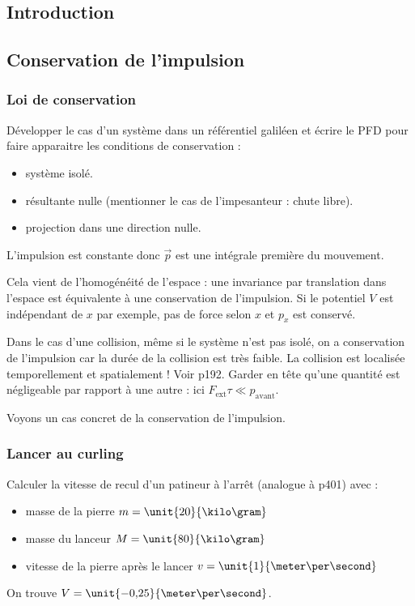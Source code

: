 \subsection*{Introduction}

\subsection{Conservation de l'impulsion}

\subsubsection{Loi de conservation}

Développer le cas d'un système dans un référentiel galiléen et écrire le PFD pour faire apparaitre les conditions de conservation :
\begin{itemize}
\item système isolé.
\item résultante nulle (mentionner le cas de l'impesanteur : chute libre).
\item projection dans une direction nulle.
\end{itemize}
L'impulsion est constante donc $\overrightarrow{p}$ est une intégrale première du mouvement.

Cela vient de l'homogénéité de l'espace : une invariance par translation dans l'espace est équivalente à une conservation de l'impulsion.
Si le potentiel $V$ est indépendant de $x$ par exemple, pas de force selon $x$ et $p_x$ est conservé.

\begin{remarque}
Dans le cas d'une collision, même si le système n'est pas isolé, on a conservation de l'impulsion car la durée de la collision est très faible.
La collision est localisée temporellement et spatialement !
Voir \cite{Seigne2014} p192.
Garder en tête qu'une quantité est négligeable par rapport à une autre : ici $F_\mathrm{ext}\tau \ll p_\mathrm{avant}$.
\end{remarque}

\begin{transition}
Voyons un cas concret de la conservation de l'impulsion.
\end{transition}

\subsubsection{Lancer au curling}

Calculer la vitesse de recul d'un patineur à l'arrêt (analogue à \cite{Bocquet2002} p401) avec :
\begin{itemize}
\item masse de la pierre $m=\unit{20}{\kilo\gram}$
\item masse du lanceur $M=\unit{80}{\kilo\gram}$
\item vitesse de la pierre après le lancer $v=\unit{1}{\meter\per\second}$
\end{itemize}
On trouve $V=\unit{-0{,}25}{\meter\per\second}$.

